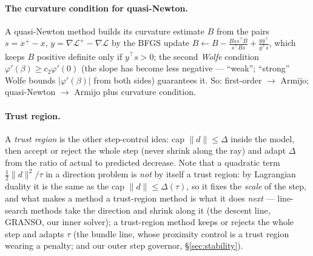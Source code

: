 \documentclass[11pt,a4paper]{article}
\newcommand{\T}{^{\!\top}}
\begin{document}
\paragraph{The curvature condition for quasi-Newton.}
A quasi-Newton method builds its curvature estimate $B$ from the pairs $s=x^+-x$,
$y=\nabla\mathcal L^+-\nabla\mathcal L$ by the BFGS update
$B\leftarrow B-\tfrac{Bss\T B}{s\T Bs}+\tfrac{yy\T}{y\T s}$, which keeps $B$ positive
definite only if $y\T s>0$; the second \emph{Wolfe} condition
$\varphi'(\beta)\ge c_2\varphi'(0)$ (the slope has become less negative --- ``weak'';
``strong'' Wolfe bounds $|\varphi'(\beta)|$ from both sides) guarantees it.  So:
first-order $\to$ Armijo; quasi-Newton $\to$ Armijo plus curvature condition.

\paragraph{Trust region.}
A \emph{trust region} is the other step-control idea: cap $\|d\|\le\Delta$ inside the
model, then accept or reject the whole step (never shrink along the ray) and adapt
$\Delta$ from the ratio of actual to predicted decrease.  Note that a quadratic term
$\tfrac12\|d\|^2/\tau$ in a direction problem is \emph{not} by itself a trust region:
by Lagrangian duality it is the same as the cap $\|d\|\le\Delta(\tau)$, so it fixes the
\emph{scale} of the step, and what makes a method a trust-region method is what it does
\emph{next} --- line-search methods take the direction and shrink along it (the descent
line, GRANSO, our inner solver); a trust-region method keeps or rejects the whole step
and adapts $\tau$ (the bundle line, whose proximity control is a trust region wearing a
penalty; and our outer step governor, \S\ref{sec:stability}).
\end{document}

